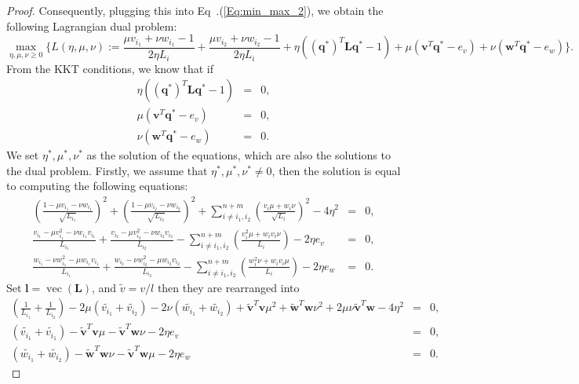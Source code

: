 \documentclass[11pt]{article}
\newcommand{\mat}[1]{\mathbf{#1}}
\renewcommand{\vec}[1]{\bm{#1}}
\begin{document}
\begin{proof}
Consequently, plugging this into Eq~.(\ref{Eq:min_max_2}), we obtain the following Lagrangian dual problem:
\begin{equation*}
\max_{\eta,\mu,\nu\geq0}
\Biggl\{ L(\eta,\mu,\nu) := \frac{\mu v_{i_1} + \nu w_{i_1}-1}{2\eta L_{i}} +\frac{\mu v_{i_2} + \nu w_{i_2}-1}{2\eta L_{i}}+ \eta(({\vec{q}^{*}})^T\mat L\vec{q}^{*}-1 )+\mu( \vec{v}^T\vec{q}^{*} - e_v ) + \nu( \vec{w}^T\vec{q}^{*} - e_w )
\Biggr\}.
\end{equation*}
From the KKT conditions, we know that if
\begin{eqnarray*}
\eta (({\vec{q}^{*}})^T\mat L\vec{q}^{*} -1) &=& 0,\\
\mu( \vec v^T\vec{q}^{*} - e_v)&=& 0,\\
\nu(\vec w^T\vec{q}^{*} - e_w) &=&0.
\end{eqnarray*}
We set $\eta^{*}, \mu^{*}, \nu^{*}$ as the solution of the equations, which are also the solutions to the dual problem. Firstly, we assume that $\eta^{*}, \mu^{*}, \nu^{*} \neq 0$, then the solution is equal to computing the following equations:
\begin{eqnarray*}
(\frac{1-\mu v_{i_1}-\nu w_{i_1}}{\sqrt{L_{i_1}}})^2 + (\frac{1-\mu v_{i_2}-\nu w_{i_2}}{\sqrt{L_{i_2}}})^2 + \sum^{n+m}_{i\neq i_1,i_2}(\frac{v_i\mu+w_i\nu}{\sqrt{L_i}})^2 - 4\eta^2 &=& 0, \\
\frac{v_{i_1}-\mu v_{i_1}^2-\nu w_{i_1}v_{i_1}}{L_{i_1}} + \frac{v_{i_2}-\mu v_{i_2}^2-\nu w_{i_2}v_{i_2}}{L_{i_2}} - \sum^{n+m}_{i\neq i_1,i_2}(\frac{v_i^2\mu +w_i v_i\nu}{L_{i}}) - 2\eta {e_v} &=& 0, \\
\frac{w_{i_1}-\nu w_{i_1}^2-\mu w_{i_1}v_{i_1}}{L_{i_1}} + \frac{w_{i_2}-\nu w_{i_2}^2-\mu w_{i_2}v_{i_2}}{L_{i_2}} - \sum^{n+m}_{i\neq i_1,i_2}(\frac{w_i^2\nu +w_i v_i\mu}{L_{i}}) - 2\eta {e_w} &=& 0.
\end{eqnarray*}
Set $\vec l = \operatorname{vec}({\mat L})$, and $\tilde{v} = v/l$ then they are rearranged into
\begin{eqnarray*}
(\frac{1}{L_{i_1}}+\frac{1}{L_{i_2}})-2\mu (\tilde{v_{i_1}}+\tilde{v_{i_2}})-2\nu(\tilde{w_{i_1}}+\tilde{w_{i_2}})+ \tilde{\vec{v}}^{T}\vec{v}\mu^2+ \tilde{\vec{w}}^{T}\vec{w}\nu^2+2\mu\nu \tilde{\vec{v}}^T{\vec{w}}- 4\eta^2 &=& 0,\\
(\tilde{v_{i_1}}+ \tilde{v_{i_1}}) - \tilde{\vec{v}}^{T}\vec{v}\mu - \tilde{\vec{v}}^T{\vec{w}}\nu - 2\eta {e_v} &=& 0, \\
(\tilde{w_{i_1}}+ \tilde{w_{i_2}}) - \tilde{\vec{w}}^{T}\vec{w}\nu - \tilde{\vec{v}}^T{\vec{w}} \mu - 2\eta {e_w} &=& 0.

\end{eqnarray*}
\end{proof}
\end{document}
